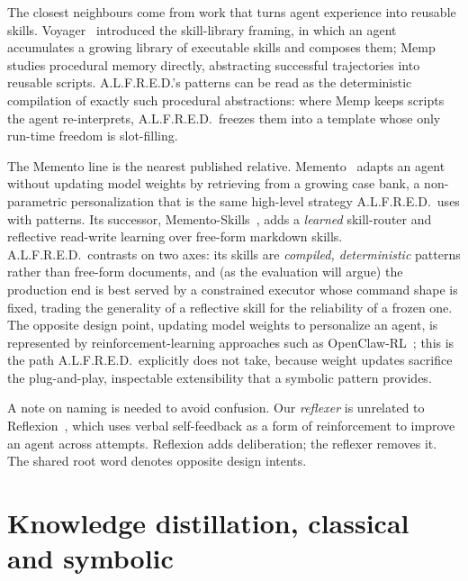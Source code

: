 The closest neighbours come from work that turns agent experience into reusable
skills. Voyager~\citep{wang2023voyager} introduced the skill-library framing, in
which an agent accumulates a growing library of executable skills and composes
them; Memp~\citep{fang2025memp} studies procedural memory directly, abstracting
successful trajectories into reusable scripts. A.L.F.R.E.D.'s patterns can be read
as the deterministic compilation of exactly such procedural abstractions: where
Memp keeps scripts the agent re-interprets, A.L.F.R.E.D.\ freezes them into a
template whose only run-time freedom is slot-filling.

The Memento line is the nearest published relative. Memento~\citep{zhou2025memento}
adapts an agent without updating model weights by retrieving from a growing case
bank, a non-parametric personalization that is the same high-level strategy
A.L.F.R.E.D.\ uses with patterns. Its successor,
Memento-Skills~\citep{zhou2026mementoskills}, adds a \emph{learned} skill-router
and reflective read-write learning over free-form markdown skills. A.L.F.R.E.D.\
contrasts on two axes: its skills are \emph{compiled, deterministic} patterns
rather than free-form documents, and (as the evaluation will argue) the production
end is best served by a constrained executor whose command shape is fixed, trading
the generality of a reflective skill for the reliability of a frozen one. The
opposite design point, updating model weights to personalize an agent, is
represented by reinforcement-learning approaches such as
OpenClaw-RL~\citep{wang2026openclawrl}; this is the path A.L.F.R.E.D.\ explicitly
does not take, because weight updates sacrifice the plug-and-play, inspectable
extensibility that a symbolic pattern provides.

A note on naming is needed to avoid confusion. Our \emph{reflexer} is unrelated to
Reflexion~\citep{shinn2023reflexion}, which uses verbal self-feedback as a form of
reinforcement to improve an agent across attempts. Reflexion adds deliberation; the
reflexer removes it. The shared root word denotes opposite design intents.

\section{Knowledge distillation, classical and symbolic}
\label{sec:bg-distillation}

